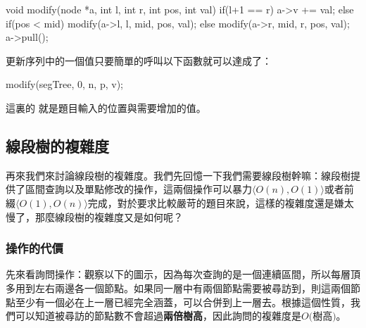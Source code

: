 \documentclass[main.tex]{subfiles}
\begin{document}
\begin{C++}
void modify(node *a, int l, int r, int pos, int val){
    if(l+1 == r) a->v += val;
    else if(pos < mid) modify(a->l, l, mid, pos, val);
    else modify(a->r, mid, r, pos, val);
    a->pull();
}
\end{C++}

更新序列中的一個值只要簡單的呼叫以下函數就可以達成了：

\begin{C++}
modify(segTree, 0, n, p, v);
\end{C++}

這裏的  就是題目輸入的位置與需要增加的值。

\subsection{線段樹的複雜度}

再來我們來討論線段樹的複雜度。我們先回憶一下我們需要線段樹幹嘛：線段樹提供了區間查詢以及單點修改的操作，這兩個操作可以暴力$\langle O(n), O(1)\rangle$或者前綴$\langle O(1), O(n)\rangle $完成，對於要求比較嚴苛的題目來說，這樣的複雜度還是嫌太慢了，那麼線段樹的複雜度又是如何呢？\\

\subsubsection{操作的代價}

先來看詢問操作：觀察以下的圖示，因為每次查詢的是一個連續區間，所以每層頂多用到左右兩邊各一個節點。如果同一層中有兩個節點需要被尋訪到，則這兩個節點至少有一個必在上一層已經完全涵蓋，可以合併到上一層去。根據這個性質，我們可以知道被尋訪的節點數不會超過\textbf{兩倍樹高}，因此詢問的複雜度是$O($樹高$)$。\\

\begin{center}

\end{center}
\end{document}
